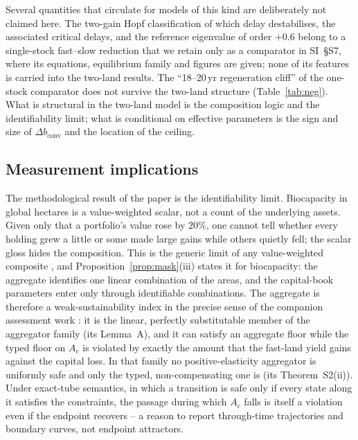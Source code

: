 \documentclass[preprint,12pt,authoryear]{elsarticle}
\newcommand{\dconv}{\Delta b_{\mathrm{conv}}}
\begin{document}
Several quantities that circulate for models of this kind are deliberately not claimed here. The two-gain Hopf classification of which delay destabilises, the associated critical delays, and the reference eigenvalue of order $+0.6$ belong to a single-stock fast--slow reduction that we retain only as a comparator in SI~\S S7, where its equations, equilibrium family and figures are given; none of its features is carried into the two-land results. The ``18--20\,yr regeneration cliff'' of the one-stock comparator does not survive the two-land structure (Table~\ref{tab:neg}). What is structural in the two-land model is the composition logic and the identifiability limit; what is conditional on effective parameters is the sign and size of $\dconv$ and the location of the ceiling.

\subsection{Measurement implications}

The methodological result of the paper is the identifiability limit. Biocapacity in global hectares is a value-weighted scalar, not a count of the underlying assets. Given only that a portfolio's value rose by $20\%$, one cannot tell whether every holding grew a little or some made large gains while others quietly fell; the scalar gloss hides the composition. This is the generic limit of any value-weighted composite \citep{Nardo2008}, and Proposition~\ref{prop:mask}(iii) states it for biocapacity: the aggregate identifies one linear combination of the areas, and the capital-book parameters enter only through identifiable combinations. The aggregate is therefore a weak-sustainability index in the precise sense of the companion assessment work \citep{Abaee2026b}: it is the linear, perfectly substitutable member of the aggregator family (its Lemma~A), and it can satisfy an aggregate floor while the typed floor on $A_c$ is violated by exactly the amount that the fast-land yield gains against the capital loss. In that family no positive-elasticity aggregator is uniformly safe and only the typed, non-compensating one is (its Theorem~S2(ii)). Under exact-tube semantics, in which a transition is safe only if every state along it satisfies the constraints, the passage during which $A_c$ falls is itself a violation even if the endpoint recovers -- a reason to report through-time trajectories and boundary curves, not endpoint attractors.
\end{document}
